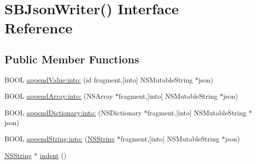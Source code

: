 \hypertarget{interface_s_b_json_writer_07_08}{
\section{\-S\-B\-Json\-Writer() \-Interface \-Reference}
\label{interface_s_b_json_writer_07_08}
}
\subsection*{\-Public \-Member \-Functions}
\begin{DoxyCompactItemize}
\item 
\-B\-O\-O\-L \hyperlink{interface_s_b_json_writer_07_08_a4364dcbbe231d0fcd36e12efaf107f51}{append\-Value\-:into\-:} (id fragment,\mbox{[}into\mbox{]} \-N\-S\-Mutable\-String $\ast$json)
\item 
\-B\-O\-O\-L \hyperlink{interface_s_b_json_writer_07_08_a5d28358c936d8c3325add8b9cf9c11f2}{append\-Array\-:into\-:} (\-N\-S\-Array $\ast$fragment,\mbox{[}into\mbox{]} \-N\-S\-Mutable\-String $\ast$json)
\item 
\-B\-O\-O\-L \hyperlink{interface_s_b_json_writer_07_08_ae7b697af01ff6197a5bf1f1cc5eba887}{append\-Dictionary\-:into\-:} (\-N\-S\-Dictionary $\ast$fragment,\mbox{[}into\mbox{]} \-N\-S\-Mutable\-String $\ast$json)
\item 
\-B\-O\-O\-L \hyperlink{interface_s_b_json_writer_07_08_aa3803962660a20ecec9f100bbd393ff6}{append\-String\-:into\-:} (\hyperlink{class_n_s_string}{\-N\-S\-String} $\ast$fragment,\mbox{[}into\mbox{]} \-N\-S\-Mutable\-String $\ast$json)
\item 
\hyperlink{class_n_s_string}{\-N\-S\-String} $\ast$ \hyperlink{interface_s_b_json_writer_07_08_aff5108b4c65eb132d710db30ca1a3d03}{indent} ()
\end{DoxyCompactItemize}


